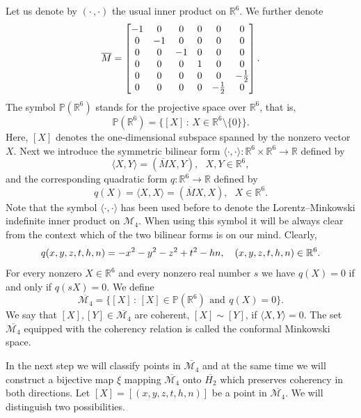 \documentclass[10pt]{amsart}
\theoremstyle{definition}
\theoremstyle{remark}
\numberwithin{subsection}{section}
\numberwithin{equation}{section}
\newcommand\cM{{\mathcal{M}}}
\newcommand\oH{{\overline{H_2}}}
\begin{document}
Let us denote by $(\cdot \, , \cdot)$ \index{$(\cdot \, , \cdot)$} the usual inner product on $\mathbb{R}^6$. We further denote 
\[
\index{$M$2@$\overline{M}$}
\overline{M} = \left[ \begin{matrix}   -1 & 0 & 0 & 0 & 0 & 0 \cr
0 & -1 & 0 & 0 & 0 & 0 \cr
0 & 0 & -1 & 0 & 0 & 0 \cr
0 & 0 & 0 & 1 & 0 & 0 \cr  
 0 & 0 & 0 & 0 & 0 & -{1\over 2}\cr
0 & 0 & 0 & 0 & -{1 \over 2} & 0 \cr\end{matrix} \right] .
\]
The symbol $\mathbb{P} ( \mathbb{R}^6 )$  stands for the projective space over $\mathbb{R}^6$, that is,
\[
\mathbb{P} ( \mathbb{R}^6 ) = \{ [X] \, : \, X \in  \mathbb{R}^6 \setminus \{ 0 \} \}.
\]
Here, $[X]$  denotes the one-dimensional subspace spanned by the nonzero vector $X$. Next we introduce the symmetric bilinear form $\langle \cdot , \cdot \rangle \colon  \mathbb{R}^6 \times  \mathbb{R}^6 \to  \mathbb{R}$ defined by
\[
\langle X , Y \rangle = (\overline{M} X,Y), \ \ \ X,Y \in  \mathbb{R}^6 ,
\]
and the corresponding quadratic form $q\colon \mathbb{R}^6 \to  \mathbb{R}$  defined by
\[
q(X) = \langle X,X \rangle = ( \overline{M} X,X), \ \ \ X \in  \mathbb{R}^6 .
\]
Note that the symbol $\langle \cdot , \cdot \rangle$ has been used before to denote the Lorentz--Minkowski indefinite inner product on $\mathcal{M}_4$. When using this symbol it will be always clear from the context which of the two bilinear forms is on our mind. 
Clearly,
\begin{equation}\label{tuniz}\index{$\langle\cdot, \cdot\rangle$}
q(x,y,z,t,h,n) = -x^2 -y^2-z^2 + t^2 -hn , \ \ \ (x,y,z,t,h,n) \in \mathbb{R}^6 .
\end{equation}
For every nonzero $X \in \mathbb{R}^6$ and every nonzero real number $s$ we have  $q(X)=0$ if and only if $q(sX) =0$. We define
\[
\overline{ \mathcal{M}_4 } = \{ [X] \, : \, [X] \in \mathbb{P} ( \mathbb{R}^6 ) \, \ \text{and} \ \, q(X) = 0 \}.
\]
We say that $[X], [Y] \in \overline{ \mathcal{M}_4 }$ are coherent, $[X] \sim [Y]$\index{$\sim$4@$\sim$ (on $\overline{\cM_4}$)}, if $\langle X , Y \rangle = 0$. The set  $\overline{ \mathcal{M}_4 }$ equipped with the coherency relation is called the conformal Minkowski space.

In the next step we will classify points in $\overline{ \mathcal{M}_4 }$ and at the same time we will construct a bijective map $\xi$  mapping $\overline{ \mathcal{M}_4 }$ onto $\oH$ which preserves coherency in both directions. Let $[X] = [ (x,y,z,t,h,n) ]$ be a point in $\overline{ \mathcal{M}_4 }$. We will distinguish two possibilities.
\end{document}
